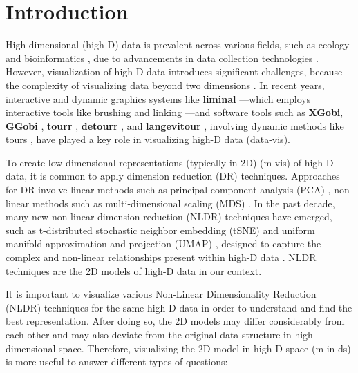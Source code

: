 \documentclass[
  12pt]{article}
\begin{document}
\newpage
{} %

\ifdefined\Shaded\renewenvironment{Shaded}{\begin{tcolorbox}[boxrule=0pt, interior hidden, sharp corners, borderline west={3pt}{0pt}{shadecolor}, breakable, frame hidden, enhanced]}{\end{tcolorbox}}\fi

\hypertarget{sec-intro}{%
\section{Introduction}\label{sec-intro}}

High-dimensional (high-D) data is prevalent across various fields, such
as ecology and bioinformatics \citep{Guo2023}, due to advancements in
data collection technologies \citep{Johnstone2009, ayesha2020overview}.
However, visualization of high-D data introduces significant challenges,
because the complexity of visualizing data beyond two dimensions
\citep{Jia2022}. In recent years, interactive and dynamic graphics
systems like \textbf{liminal} \citep{article21} ---which employs
interactive tools like brushing and linking \citep{article58}---and
software tools such as \textbf{XGobi}, \textbf{GGobi} \citep{article60},
\textbf{tourr} \citep{article61}, \textbf{detourr} \citep{article22},
and \textbf{langevitour} \citep{article09}, involving dynamic methods
like tours \citep{Asimov1985}, have played a key role in visualizing
high-D data (data-vis).

To create low-dimensional representations (typically in 2D) (m-vis)
\citep{article59} of high-D data, it is common to apply dimension
reduction (DR) techniques. Approaches for DR involve linear methods such
as principal component analysis (PCA) \citep{Karl1901}, non-linear
methods such as multi-dimensional scaling (MDS) \citep{Torgerson1967}.
In the past decade, many new non-linear dimension reduction (NLDR)
techniques have emerged, such as t-distributed stochastic neighbor
embedding (tSNE) \citep{Laurens2008} and uniform manifold approximation
and projection (UMAP) \citep{Leland2018}, designed to capture the
complex and non-linear relationships present within high-D data
\citep{Johnstone2009}. NLDR techniques are the 2D models of high-D data
in our context.

It is important to visualize various Non-Linear Dimensionality Reduction
(NLDR) techniques for the same high-D data in order to understand and
find the best representation. After doing so, the 2D models may differ
considerably from each other and may also deviate from the original data
structure in high-dimensional space. Therefore, visualizing the 2D model
in high-D space (m-in-ds) is more useful to answer different types of
questions:
\end{document}
